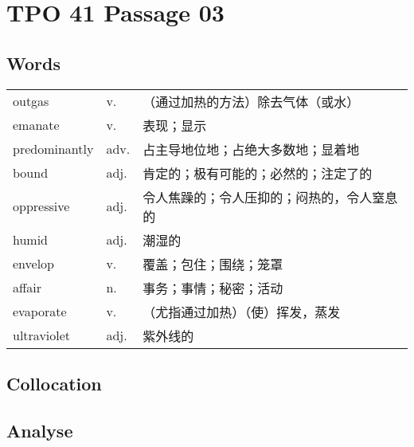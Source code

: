 \section{TPO 41 Passage 03}

\subsection{Words}

\begin{tabular}{lll}
    outgas        & v.   & （通过加热的方法）除去气体（或水）     \\
    emanate       & v.   & 表现；显示                 \\
    predominantly & adv. & 占主导地位地；占绝大多数地；显着地     \\
    bound         & adj. & 肯定的；极有可能的；必然的；注定了的    \\
    oppressive    & adj. & 令人焦躁的；令人压抑的；闷热的，令人窒息的 \\
    humid         & adj. & 潮湿的                   \\
    envelop       & v.   & 覆盖；包住；围绕；笼罩           \\
    affair        & n.   & 事务；事情；秘密；活动           \\
    evaporate     & v.   & （尤指通过加热）（使）挥发，蒸发      \\
    ultraviolet   & adj. & 紫外线的                  \\
\end{tabular}

\subsection{Collocation}


\subsection{Analyse}

